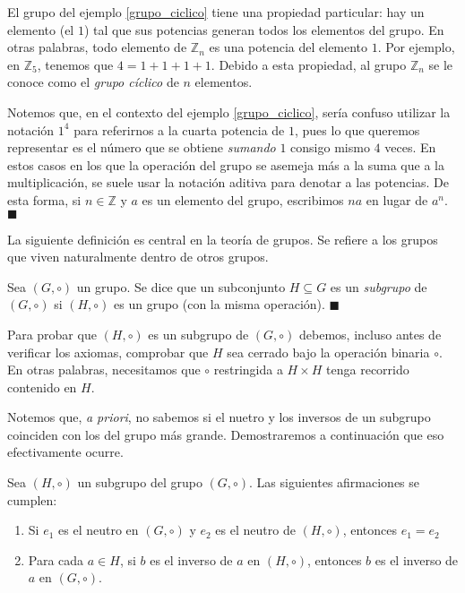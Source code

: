 El grupo del ejemplo \ref{grupo_ciclico} tiene una propiedad particular: hay un elemento (el $1$) tal que sus potencias generan todos los elementos del grupo. En otras palabras, todo elemento de $\mathbb{Z}_n$ es una potencia del elemento $1$. Por ejemplo, en $\mathbb{Z}_5$, tenemos que $4 = 1 + 1 + 1 + 1$. Debido a esta propiedad, al grupo $\mathbb{Z}_n$ se le conoce como el \emph{grupo cíclico} de $n$ elementos. 

\begin{remark} Notemos que, en el contexto del ejemplo \ref{grupo_ciclico}, sería confuso utilizar la notación $1^4$ para referirnos a la cuarta potencia de $1$, pues lo que queremos representar es el número que se obtiene \textit{sumando} $1$ consigo mismo $4$ veces. En estos casos en los que la operación del grupo se asemeja más a la suma que a la multiplicación, se suele usar la notación aditiva para denotar a las potencias. De esta forma, si $n \in \mathbb{Z}$ y $a$ es un elemento del grupo, escribimos $n a$ en lugar de $a^n$. \hfill$\blacksquare$
\end{remark}


La siguiente definición es central en la teoría de grupos. Se refiere a los grupos que viven naturalmente dentro de otros grupos.

\begin{definition}
Sea $(G,\circ)$ un grupo. Se dice que un subconjunto $H \subseteq G$ es un \emph{subgrupo} de $(G,\circ)$ si $(H, \circ)$ es un grupo (con la misma operación). \hfill$\blacksquare$
\end{definition}

Para probar que $(H, \circ)$ es un subgrupo de $(G, \circ)$ debemos, incluso antes de verificar los axiomas, comprobar que $H$ sea cerrado bajo la operación binaria $\circ$. En otras palabras, necesitamos que $\circ$ restringida a $H \times H$ tenga recorrido contenido en $H$. 


Notemos que, \textit{a priori}, no sabemos si el nuetro y los inversos de un subgrupo coinciden con los del grupo más grande. Demostraremos a continuación que eso efectivamente ocurre.


\begin{proposition}
Sea $(H, \circ)$ un subgrupo del grupo $(G, \circ)$. Las siguientes afirmaciones se cumplen:
	\begin{enumerate}
		\item Si $e_1$ es el neutro en $(G, \circ)$ y $e_2$ es el neutro de $(H, \circ)$, entonces $e_1 = e_2$

		\item Para cada $a \in H$, si $b$ es el inverso de $a$ en $(H, \circ)$, entonces $b$ es el inverso de $a$ en $(G, \circ)$.
	\end{enumerate}
\end{proposition}

